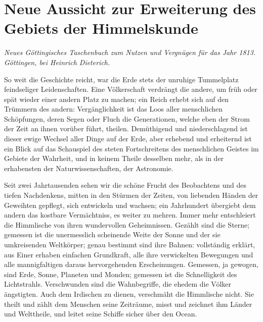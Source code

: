 \documentclass[10pt,a4paper]{article}
\begin{document}
\clearpage
\section*{Neue Aussicht zur Erweiterung des Gebiets der Himmelskunde}

\begin{center}
\small
\textit{Neues Göttingisches Taschenbuch zum Nutzen und Vergnügen für das Jahr 1813.}\\
\textit{Göttingen, bei Heinrich Dieterich.}
\end{center}

\medskip
\noindent
So weit die Geschichte reicht, war die Erde stets der unruhige Tummelplatz feindseliger Leidenschaften. Eine Völkerschaft verdrängt die andere, um früh oder spät wieder einer andern Platz zu machen; ein Reich erhebt sich auf den Trümmern des andern: Vergänglichkeit ist das Loos aller menschlichen Schöpfungen, deren Segen oder Fluch die Generationen, welche eben der Strom der Zeit an ihnen vorüber führt, theilen. Demüthigend und niederschlagend ist dieser ewige Wechsel aller Dinge auf der Erde, aber erhebend und erheiternd ist ein Blick auf das Schauspiel des steten Fortschreitens des menschlichen Geistes im Gebiete der Wahrheit, und in keinem Theile desselben mehr, als in der erhabensten der Naturwissenschaften, der Astronomie.

Seit zwei Jahrtausenden sehen wir die schöne Frucht des Beobachtens und des tiefen Nachdenkens, mitten in den Stürmen der Zeiten, von liebenden Händen der Geweihten gepflegt, sich entwickeln und wachsen; ein Jahrhundert übergiebt dem andern das kostbare Vermächtniss, es weiter zu mehren. Immer mehr entschleiert die Himmlische von ihren wundervollen Geheimnissen. Gezählt sind die Sterne; gemessen ist die unermesslich scheinende Weite der Sonne und der sie umkreisenden Weltkörper; genau bestimmt sind ihre Bahnen: vollständig erklärt, aus Einer erhaben einfachen Grundkraft, alle ihre verwickelten Bewegungen und alle mannigfaltigen daraus hervorgehenden Erscheinungen. Gemessen, ja gewogen, sind Erde, Sonne, Planeten und Monden; gemessen ist die Schnelligkeit des Lichtstrahls. Verschwunden sind die Wahnbegriffe, die ehedem die Völker ängstigten. Auch dem Irdischen zu dienen, verschmäht die Himmlische nicht. Sie theilt und zählt dem Menschen seine Zeiträume, misst und zeichnet ihm Länder und Welttheile, und leitet seine Schiffe sicher über den Ocean.
\end{document}
